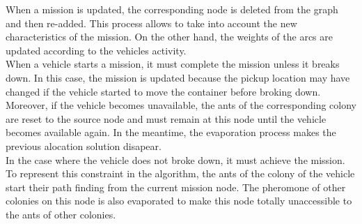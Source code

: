 \documentclass[a4paper,10pt]{article}
\begin{document}
When a mission is updated, the corresponding node is deleted from the graph and then re-added. This process allows to take into account the new characteristics of the mission. On the other hand, the weights of the arcs are updated according to the vehicles activity.
\\

When a vehicle starts a mission, it must complete the mission unless it breaks down. In this case, the mission is updated because the pickup location may have changed if the vehicle started to move the container before broking down. Moreover, if the vehicle becomes unavailable, the ants of the corresponding colony are reset to the source node and must remain at this node until the vehicle becomes available again. In the meantime, the evaporation process makes the previous alocation solution disapear.\\

In the case where the vehicle does not broke down, it must achieve the mission. To represent this constraint in the algorithm, the ants of the colony of the vehicle start their path finding from the current mission node. The pheromone of other colonies on this node is also evaporated to make this node totally unaccessible to the ants of other colonies.
\end{document}
